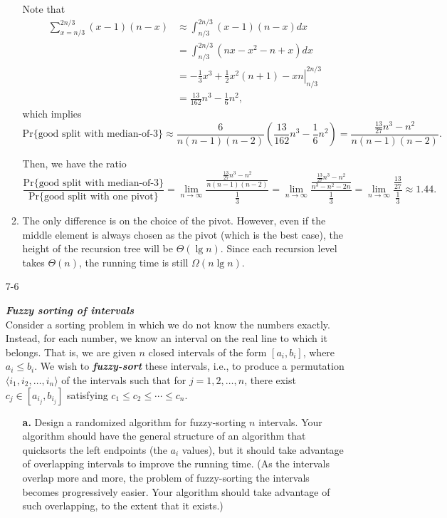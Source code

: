 \documentclass{report}
\makeatletter
\renewenvironment{framed}{%
 \def\FrameCommand##1{\hskip\@totalleftmargin
 \fboxsep=\FrameSep\fbox{##1}}%
 \MakeFramed {\advance\hsize-\width
   \@totalleftmargin\z@ \linewidth\hsize
   \@setminipage}}%
 {\par\unskip\endMakeFramed}
\newcommand*\Eval[3]{\left.#1\right\rvert_{#2}^{#3}}
\makeatother
\begin{document}
\begin{enumerate}
\begin{framed}
\begin{enumerate}
{Note that
\begin{equation*}
\begin{aligned}
\sum_{x = n/3}^{2n/3} (x - 1) (n - x)
&\approx \int_{n/3}^{2n/3} (x - 1) (n - x) dx\\
&= \int_{n/3}^{2n/3} (nx -x^2 - n + x) dx\\
&= \Eval{-\frac{1}{3} x^3 + \frac{1}{2} x^2 (n + 1) - xn}{n/3}{2n/3}\\
&= \frac{13}{162} n^3 - \frac{1}{6} n^2,
\end{aligned}
\end{equation*}
which implies
\[
 \text{Pr}\{\text{good split with median-of-3}\} \approx \frac{6}{n (n - 1)(n - 2)} \left( \frac{13}{162} n^3 - \frac{1}{6} n^2 \right)
= \frac{\frac{13}{27} n^3 - n^2}{n (n - 1) (n - 2)}.
\]

Then, we have the ratio
\[
\frac{\text{Pr}\{\text{good split with median-of-3}\}}{\text{Pr}\{\text{good split with one pivot}\}}
= \lim_{n\to\infty} \frac{\frac{\frac{13}{27} n^3 - n^2}{n (n - 1) (n - 2)}}{\frac{1}{3}}
= \lim_{n\to\infty} \frac{\frac{\frac{13}{27} n^3 - n^2}{n^3 - n^2 - 2n}}{\frac{1}{3}}
= \lim_{n\to\infty} \frac{\frac{13}{27}}{\frac{1}{3}} \approx 1.44.
\]

}
\item{The only difference is on the choice of the pivot. However, even if the
middle element is always chosen as the pivot (which is the best case), the
height of the recursion tree will be $\Theta(\lg n)$. Since each recursion level
takes $\Theta(n)$, the running time is still $\Omega(n \lg n)$.}
\end{enumerate}
\end{framed}

\newpage

\item[7{-}6]{\textbf{\emph{Fuzzy sorting of intervals}}\\
Consider a sorting problem in which we do not know the numbers exactly. Instead,
for each number, we know an interval on the real line to which it belongs.
That is, we are given $n$ closed intervals of the form $[a_i, b_i]$, where
$a_i \le b_i$. We wish to \textbf{\emph{fuzzy-sort}} these intervals, i.e., to
produce a permutation $\langle i_1, i_2, \dots, i_n \rangle$ of the intervals
such that for $j = 1, 2, \dots, n$, there exist $c_j \in [a_{i_j}, b_{i_j}]$
satisfying $c_1 \le c_2 \le \cdots \le c_n$.

\begin{enumerate}
\item[\textbf{a.}]{Design a randomized algorithm for fuzzy-sorting $n$
intervals.  Your algorithm should have the general structure of an algorithm
that quicksorts the left endpoints (the $a_i$ values), but it should take
advantage of overlapping intervals to improve the running time. (As the
intervals overlap more and more, the problem of fuzzy-sorting the intervals
becomes progressively easier. Your algorithm should take advantage of such
overlapping, to the extent that it exists.)}


\end{enumerate}}
\end{enumerate}
\end{document}
